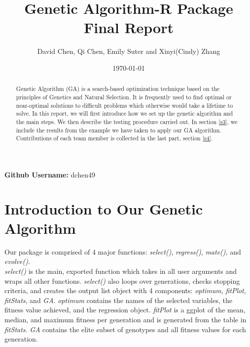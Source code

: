 \documentclass{article}
\begin{document}


\title{\LARGE Genetic Algorithm-R Package Final Report}
\author{David Chen, Qi Chen, Emily Suter and Xinyi(Cindy) Zhang}


\date{\today}

\maketitle

\begin{abstract}
Genetic Algorithm (GA) is a search-based optimization technique based on the principles of Genetics and Natural Selection. It is frequently used to find optimal or near-optimal solutions to difficult problems which otherwise would take a lifetime to solve. In this report, we will first introduce how we set up the genetic algorithm and the main steps. We then describe the testing procedure carried out. In section \ref{s3}, we include the results from the example we have taken to apply our GA algorithm. Contributions of each team member is collected in the last part, section \ref{s4}.
\end{abstract}

\textbf{Github Username:} dchen49

\newpage
\pagestyle{empty}

\section{Introduction to Our Genetic Algorithm}\label{s1}

Our package is comprised of 4 major functions: \textit{select()}, \textit{regress()}, \textit{mate()}, and \textit{evolve()}.\\

\textit{select()} is the main, exported function which takes in all user arguments and wraps all other functions. \textit{select()} also loops over generations, checks stopping criteria, and creates the output list object with 4 components: \textit{optimum}, \textit{fitPlot}, \textit{fitStats}, and \textit{GA}. \textit{optimum} contains the names of the selected variables, the fitness value achieved, and the regression object. \textit{fitPlot} is a ggplot of the mean, median, and maximum fitness per generation and is generated from the table in \textit{fitStats}. \textit{GA} contains the elite subset of genotypes and all fitness values for each generation.\\
\end{document}
